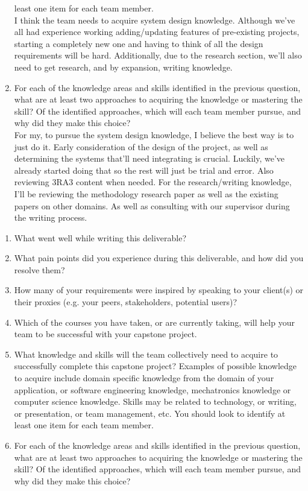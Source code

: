 \begin{enumerate}
  least one item for each team member. \\
  I think the team needs to acquire system design knowledge. Although we've all had experience working adding/updating features of pre-existing projects, starting a completely new one and having to think of all the design requirements will be hard. Additionally, due to the research section, we'll also need to get research, and by expansion, writing knowledge.
  \item For each of the knowledge areas and skills identified in the previous
  question, what are at least two approaches to acquiring the knowledge or
  mastering the skill?  Of the identified approaches, which will each team
  member pursue, and why did they make this choice? \\
  For my, to pursue the system design knowledge, I believe the best way is to just do it. Early consideration of the design of the project, as well as determining the systems that'll need integrating is crucial. Luckily, we've already started doing that so the rest will just be trial and error. Also reviewing 3RA3 content when needed.
  For the research/writing knowledge, I'll be reviewing the methodology research paper as well as the existing papers on other domains. As well as consulting with our supervisor during the writing process.
\end{enumerate}

\begin{enumerate}
  \item What went well while writing this deliverable? 
  \item What pain points did you experience during this deliverable, and how did
  you resolve them?
  \item How many of your requirements were inspired by speaking to your
  client(s) or their proxies (e.g. your peers, stakeholders, potential users)?
  \item Which of the courses you have taken, or are currently taking, will help
  your team to be successful with your capstone project.
  \item What knowledge and skills will the team collectively need to acquire to
  successfully complete this capstone project?  Examples of possible knowledge
  to acquire include domain specific knowledge from the domain of your
  application, or software engineering knowledge, mechatronics knowledge or
  computer science knowledge.  Skills may be related to technology, or writing,
  or presentation, or team management, etc.  You should look to identify at
  least one item for each team member.
  \item For each of the knowledge areas and skills identified in the previous
  question, what are at least two approaches to acquiring the knowledge or
  mastering the skill?  Of the identified approaches, which will each team
  member pursue, and why did they make this choice?
\end{enumerate}

